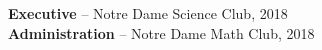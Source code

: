 

 \textbf{Executive} – Notre Dame Science Club, 2018 \\
 \vspace{1mm}
 \textbf{Administration} – Notre Dame Math Club, 2018 \\